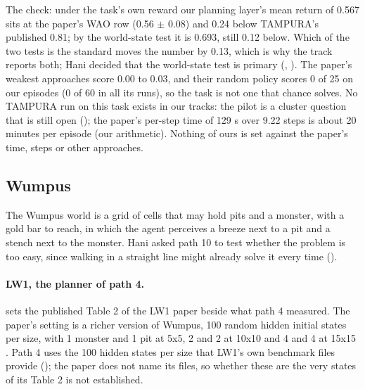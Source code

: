 The check: under the task's own reward our planning layer's mean return of 0.567
sits at the paper's WAO row (0.56 $\pm$ 0.08) and 0.24 below TAMPURA's published
0.81; by the world-state test it is 0.693, still 0.12 below. Which of the two tests
is the standard moves the number by 0.13, which is why the track reports both;
Hani decided that the world-state test is primary (, ). The paper's
weakest approaches score 0.00 to 0.03, and their random policy scores 0 of 25 on our
episodes (0 of 60 in all its runs), so the task is not one that chance solves. No TAMPURA run on this task
exists in our tracks: the pilot is a cluster question that is still open
(); the paper's per-step time of 129 s over 9.22 steps is about 20 minutes
per episode (our arithmetic). Nothing of ours is set against the paper's time,
steps or other approaches.

\subsection{Wumpus}

The Wumpus world is a grid of cells that may hold pits and a monster, with a gold
bar to reach, in which the agent perceives a breeze next to a pit and a stench next
to the monster. Hani asked path 10 to test whether the problem is too easy, since
walking in a straight line might already solve it every time ().

\paragraph{LW1, the planner of path 4.}  sets the published
Table 2 of the LW1 paper \cite{bonet2014flexible} beside what path 4 measured. The
paper's setting is a richer version of Wumpus, 100 random hidden initial states
per size, with 1 monster and 1 pit at 5x5, 2 and 2 at 10x10 and 4 and 4 at 15x15
\cite{bonet2014flexible}. Path 4 uses the 100 hidden states per size that LW1's own
benchmark files provide (); the paper does not name its files, so whether
these are the very states of its Table 2 is not established.

